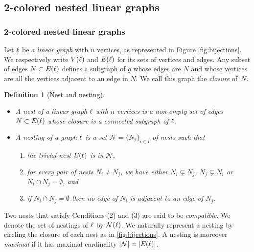 \documentclass[twoside, 12pt]{amsart}
\newtheorem{definition}{Definition}[section]
\theoremstyle{remark}
\begin{document}

\subsection{2-colored nested linear graphs}


\subsubsection{2-colored nested linear graphs}

Let $\ell$ be a \emph{linear graph} with $n$ vertices, as represented in Figure \ref{fig:bijections}.
We respectively write $V(\ell)$ and $E(\ell)$ for its sets of vertices and edges.
Any subset of edges $N\subset E(\ell)$ defines a subgraph of $g$ whose edges are $N$ and whose vertices are all the vertices adjacent to an edge in $N$. 
We call this graph the \emph{closure} of~$N$. 

\begin{definition}[Nest and nesting]
\leavevmode
\begin{itemize}[leftmargin=*]
\item A \emph{nest} of a linear graph $\ell$ with $n$ vertices is a non-empty set of edges $N \subset E(\ell)$ whose closure is a connected subgraph of $\ell$.  
\item A \emph{nesting} of a graph $\ell$ is a set $\mathcal{N}=\{N_i\}_{i\in I}$ of nests such that 
\begin{enumerate}[leftmargin=*]
    \item the \emph{trivial nest} $E(\ell)$ is in $\mathcal{N}$,
    \item for every pair of nests $N_i\neq N_j$, we have either $N_i \subsetneq N_j$, $N_j \subsetneq N_i$ or $N_i \cap N_j = \emptyset$, and
    \item if $N_i \cap N_j = \emptyset$ then no edge of $N_i$ is adjacent to an edge of $N_j$.
\end{enumerate}
\end{itemize}
\end{definition}

Two nests that satisfy Conditions (2) and (3) are said to be \textit{compatible}. 
We denote the set of nestings of $\ell$ by $\mathcal{N}(\ell)$. 
We naturally represent a nesting by circling the closure of each nest as in \cref{fig:bijections}. 
A nesting is moreover \emph{maximal} if it has maximal cardinality $|\mathcal{N}|=|E(\ell)|$.
\end{document}
